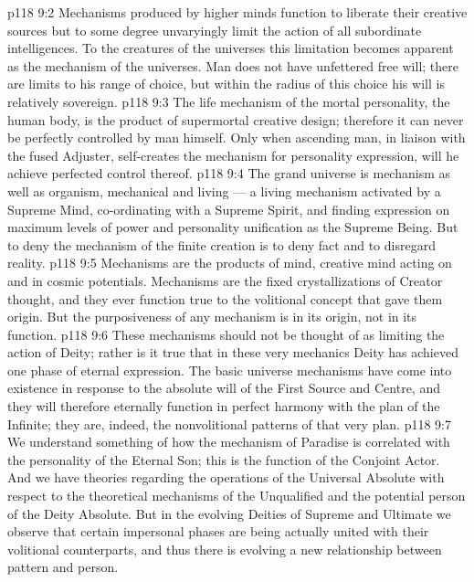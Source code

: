 \vs p118 9:2 Mechanisms produced by higher minds function to liberate their creative sources but to some degree unvaryingly limit the action of all subordinate intelligences. To the creatures of the universes this limitation becomes apparent as the mechanism of the universes. Man does not have unfettered free will; there are limits to his range of choice, but within the radius of this choice his will is relatively sovereign.
\vs p118 9:3 The life mechanism of the mortal personality, the human body, is the product of supermortal creative design; therefore it can never be perfectly controlled by man himself. Only when ascending man, in liaison with the fused Adjuster, self\hyp{}creates the mechanism for personality expression, will he achieve perfected control thereof.
\vs p118 9:4 The grand universe is mechanism as well as organism, mechanical and living --- a living mechanism activated by a Supreme Mind, co\hyp{}ordinating with a Supreme Spirit, and finding expression on maximum levels of power and personality unification as the Supreme Being. But to deny the mechanism of the finite creation is to deny fact and to disregard reality.
\vs p118 9:5 Mechanisms are the products of mind, creative mind acting on and in cosmic potentials. Mechanisms are the fixed crystallizations of Creator thought, and they ever function true to the volitional concept that gave them origin. But the purposiveness of any mechanism is in its origin, not in its function.
\vs p118 9:6 These mechanisms should not be thought of as limiting the action of Deity; rather is it true that in these very mechanics Deity has achieved one phase of eternal expression. The basic universe mechanisms have come into existence in response to the absolute will of the First Source and Centre, and they will therefore eternally function in perfect harmony with the plan of the Infinite; they are, indeed, the nonvolitional patterns of that very plan.
\vs p118 9:7 We understand something of how the mechanism of Paradise is correlated with the personality of the Eternal Son; this is the function of the Conjoint Actor. And we have theories regarding the operations of the Universal Absolute with respect to the theoretical mechanisms of the Unqualified and the potential person of the Deity Absolute. But in the evolving Deities of Supreme and Ultimate we observe that certain impersonal phases are being actually united with their volitional counterparts, and thus there is evolving a new relationship between pattern and person.

